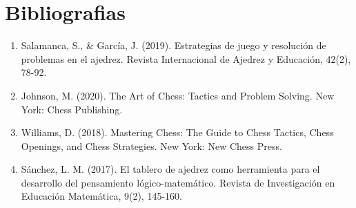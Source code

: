 \chapter{Bibliografias}
\begin{enumerate}
    \item Salamanca, S., & García, J. (2019). Estrategias de juego y resolución de problemas en el ajedrez. Revista Internacional de Ajedrez y Educación, 42(2), 78-92.\newline
    \item Johnson, M. (2020). The Art of Chess: Tactics and Problem Solving. New York: Chess Publishing.\newline
    \item Williams, D. (2018). Mastering Chess: The Guide to Chess Tactics, Chess Openings, and Chess Strategies. New York: New Chess Press.\newline
    \item Sánchez, L. M. (2017). El tablero de ajedrez como herramienta para el desarrollo del pensamiento lógico-matemático. Revista de Investigación en Educación Matemática, 9(2), 145-160.\newline
\end{enumerate}

















